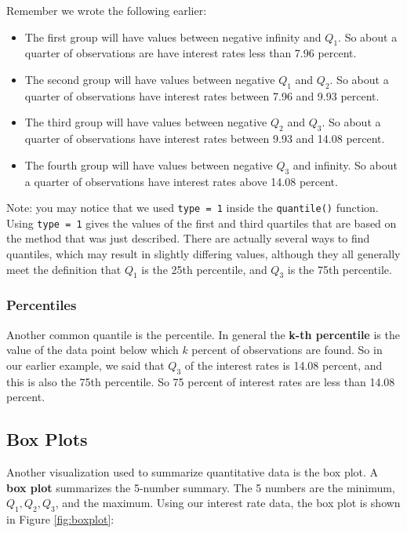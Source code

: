 \documentclass[
]{book}
\providecommand{\tightlist}{%
  \setlength{\itemsep}{0pt}\setlength{\parskip}{0pt}}
\begin{document}
Remember we wrote the following earlier:

\begin{itemize}
\tightlist
\item
  The first group will have values between negative infinity and \(Q_1\). So about a quarter of observations are have interest rates less than 7.96 percent.
\item
  The second group will have values between negative \(Q_1\) and \(Q_2\). So about a quarter of observations have interest rates between 7.96 and 9.93 percent.
\item
  The third group will have values between negative \(Q_2\) and \(Q_3\). So about a quarter of observations have interest rates between 9.93 and 14.08 percent.
\item
  The fourth group will have values between negative \(Q_3\) and infinity. So about a quarter of observations have interest rates above 14.08 percent.
\end{itemize}

Note: you may notice that we used \texttt{type\ =\ 1} inside the \texttt{quantile()} function. Using \texttt{type\ =\ 1} gives the values of the first and third quartiles that are based on the method that was just described. There are actually several ways to find quantiles, which may result in slightly differing values, although they all generally meet the definition that \(Q_1\) is the 25th percentile, and \(Q_3\) is the 75th percentile.

\hypertarget{percentiles}{%
\subsubsection{Percentiles}\label{percentiles}}

Another common quantile is the percentile. In general the \textbf{k-th percentile} is the value of the data point below which \(k\) percent of observations are found. So in our earlier example, we said that \(Q_3\) of the interest rates is 14.08 percent, and this is also the 75th percentile. So 75 percent of interest rates are less than 14.08 percent.

\hypertarget{box-plots}{%
\subsection{Box Plots}\label{box-plots}}

Another visualization used to summarize quantitative data is the box plot. A \textbf{box plot} summarizes the 5-number summary. The 5 numbers are the minimum, \(Q_1, Q_2, Q_3\), and the maximum. Using our interest rate data, the box plot is shown in Figure \ref{fig:boxplot}:
\end{document}

